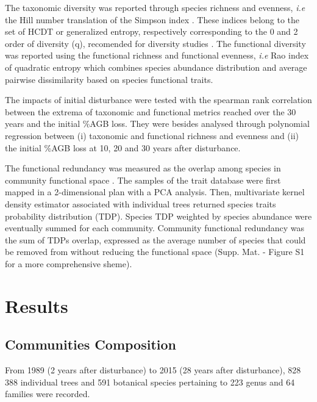 \documentclass[fleqn,10pt]{ArtEcoFoG} %
\begin{document}
The taxonomic diversity was reported through species richness and
evenness, \emph{i.e} the Hill number translation of the Simpson index
\citep{Hill1973}. These indices belong to the set of HCDT or generalized
entropy, respectively corresponding to the 0 and 2 order of diversity
(q), recomended for diversity studies \citep{Marcon2015b}. The
functional diversity was reported using the functional richness and
functional evenness, \emph{i.e} Rao index of quadratic entropy which
combines species abundance distribution and average pairwise
dissimilarity based on species functional traits.

The impacts of initial disturbance were tested with the spearman rank
correlation between the extrema of taxonomic and functional metrics
reached over the 30 years and the initial \%AGB loss. They were besides
analysed through polynomial regression between (i) taxonomic and
functional richness and evenness and (ii) the initial \%AGB loss at 10,
20 and 30 years after disturbance.

The functional redundancy was measured as the overlap among species in
community functional space \citep{Carmona2016}. The samples of the trait
database were first mapped in a 2-dimensional plan with a PCA analysis.
Then, multivariate kernel density estimator associated with individual
trees returned species traits probability distribution (TDP). Species
TDP weighted by species abundance were eventually summed for each
community. Community functional redundancy was the sum of TDPs overlap,
expressed as the average number of species that could be removed from
without reducing the functional space (Supp. Mat. - Figure S1 for a more
comprehensive sheme).

\section{Results}\label{results}

\subsection{Communities Composition}\label{communities-composition}

From 1989 (2 years after disturbance) to 2015 (28 years after
disturbance), 828 388 individual trees and 591 botanical species
pertaining to 223 genus and 64 families were recorded.
\end{document}
